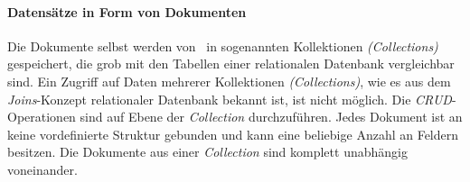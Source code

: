 \paragraph{Datensätze in Form von Dokumenten}

Die Dokumente selbst werden von \mongo\ in sogenannten Kollektionen \textit{(Collections)} gespeichert, die grob mit den Tabellen einer relationalen Datenbank vergleichbar sind. Ein Zugriff auf Daten mehrerer Kollektionen \textit{(Collections)}, wie es aus dem \textit{Joins}-Konzept relationaler Datenbank bekannt ist, ist nicht möglich. Die \textit{CRUD}-Operationen sind auf Ebene der \textit{Collection} durchzuführen. Jedes Dokument ist an keine vordefinierte Struktur gebunden und kann eine beliebige Anzahl an Feldern besitzen. Die Dokumente aus einer \textit{Collection} sind komplett unabhängig voneinander. 

